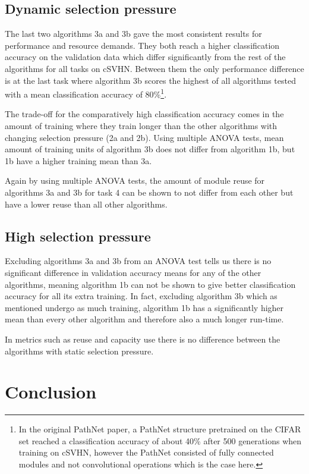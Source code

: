 \subsection{Dynamic selection pressure}
The last two algorithms 3a and 3b gave the most consistent results for performance and resource demands. They both reach a higher classification accuracy on the validation data which differ significantly from the rest of the algorithms for all tasks on cSVHN. Between them the only performance difference is at the last task where algorithm 3b scores the highest of all algorithms tested with a mean classification accuracy of 80\%\footnote{In the original PathNet paper, a PathNet structure pretrained on the CIFAR set reached a classification accuracy of about 40\% after 500 generations when training on cSVHN, however the PathNet consisted of fully connected modules and not convolutional operations which is the case here.}.

The trade-off for the comparatively high classification accuracy comes in the amount of training where they train longer than the other algorithms with changing selection pressure (2a and 2b). Using multiple ANOVA tests, mean amount of training units of algorithm 3b does not differ from algorithm 1b, but 1b have a higher training mean than 3a.

Again by using multiple ANOVA tests, the amount of module reuse for algorithms 3a and 3b for task 4 can be shown to not differ from each other but have a lower reuse than all other algorithms. 

\subsection{High selection pressure}
Excluding algorithms 3a and 3b from an ANOVA test tells us there is no significant difference in validation accuracy means for any of the other algorithms, meaning algorithm 1b can not be shown to give better classification accuracy for all its extra training. 
In fact, excluding algorithm 3b which as mentioned undergo as much training, algorithm 1b has a significantly higher mean than every other algorithm and therefore also a much longer run-time. 

In metrics such as reuse and capacity use there is no difference between the algorithms with static selection pressure. 

\section{Conclusion}

